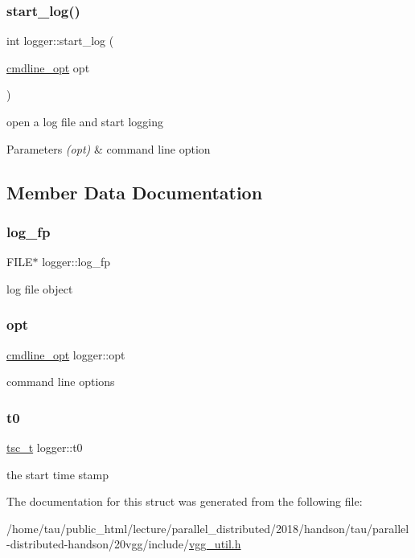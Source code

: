 \subsubsection{\texorpdfstring{start\+\_\+log()}{start\_log()}}
{\footnotesize\ttfamily int logger\+::start\+\_\+log (\begin{DoxyParamCaption}\item[{\hyperlink{structcmdline__opt}{cmdline\+\_\+opt}}]{opt }\end{DoxyParamCaption})\hspace{0.3cm}{\ttfamily [inline]}}



open a log file and start logging 


\begin{DoxyParams}{Parameters}
{\em (opt)} & command line option \\
\hline
\end{DoxyParams}


\subsection{Member Data Documentation}
\mbox{\label{structlogger_ab891d941fb5846a3f8678f1db11c0da9}} 
\subsubsection{\texorpdfstring{log\+\_\+fp}{log\_fp}}
{\footnotesize\ttfamily F\+I\+LE$\ast$ logger\+::log\+\_\+fp}

log file object \mbox{\label{structlogger_a0e07e1e52c554084e6c3c06476024b9a}} 
\subsubsection{\texorpdfstring{opt}{opt}}
{\footnotesize\ttfamily \hyperlink{structcmdline__opt}{cmdline\+\_\+opt} logger\+::opt}

command line options \mbox{\label{structlogger_a6336fd3fffff10df04811a819c1c5a70}} 
\subsubsection{\texorpdfstring{t0}{t0}}
{\footnotesize\ttfamily \hyperlink{structtsc__t}{tsc\+\_\+t} logger\+::t0}

the start time stamp 

The documentation for this struct was generated from the following file\+:\begin{DoxyCompactItemize}
\item 
/home/tau/public\+\_\+html/lecture/parallel\+\_\+distributed/2018/handson/tau/parallel-\/distributed-\/handson/20vgg/include/\hyperlink{vgg__util_8h}{vgg\+\_\+util.\+h}\end{DoxyCompactItemize}
